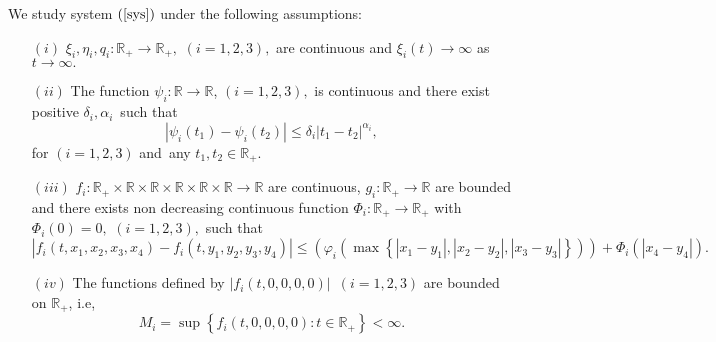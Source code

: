 \documentclass{amsart}
\theoremstyle{plain}
\numberwithin{equation}{section}
\begin{document}
\bigskip

\bigskip

\qquad We study system $\left( \text{\ref{sys}}\right) $ under the following
assumptions:

\begin{enumerate}
\item[$\left( i\right) $] $\xi _{i},\eta _{i},q_{i}:\mathbb{R}_{+}\rightarrow \mathbb{R}_{+},$ $\left( i=1,2,3\right) ,$ are continuous
and $\xi _{i}\left( t\right) \rightarrow \infty $ as $t\rightarrow \infty .$

\item[$\left( ii\right) $] The function $\psi _{i}:\mathbb{R\rightarrow R}$, 
$\left( i=1,2,3\right) ,$ is continuous and there exist positive $\delta
_{i},\alpha _{i}$\ such that 
\begin{equation*}
\left\vert \psi _{i}\left( t_{1}\right) -\psi _{i}\left( t_{2}\right)
\right\vert \leqslant \delta _{i}\left\vert t_{1}-t_{2}\right\vert ^{\alpha
_{i}},
\end{equation*}for $\left( i=1,2,3\right) $ and\ any $t_{1},t_{2}\in \mathbb{R}_{+}$.

\item[$\left( iii\right) $] $f_{i}:\mathbb{R}_{+}\times \mathbb{R\times
R\times R\times R\times R\rightarrow R}$ are continuous, $g_{i}:\mathbb{R}_{+}\mathbb{\rightarrow R}$ are bounded and there exists non decreasing
continuous function $\Phi _{i}:\mathbb{R}_{+}\mathbb{\rightarrow R}_{+}$
with $\Phi _{i}\left( 0\right) =0,$ $\left( i=1,2,3\right) ,$ such that\begin{equation*}
\left\vert f_{i}\left( t,x_{1},x_{2},x_{3},x_{4}\right) -f_{i}\left(
t,y_{1},y_{2},y_{3},y_{4}\right) \right\vert \leqslant \left( \varphi
_{i}\left( \max \left\{ \left\vert x_{1}-y_{1}\right\vert ,\left\vert
x_{2}-y_{2}\right\vert ,\left\vert x_{3}-y_{3}\right\vert \right\} \right)
\right) +\Phi _{i}\left( \left\vert x_{4}-y_{4}\right\vert \right) .
\end{equation*}

\item[$\left( iv\right) $] The functions defined by $\left\vert f_{i}\left(
t,0,0,0,0\right) \right\vert $\ $\left( i=1,2,3\right) $ are bounded on $\mathbb{R}_{+}$, i.e,\begin{equation}
M_{i}=\sup \left\{ f_{i}\left( t,0,0,0,0\right) :t\in \mathbb{R}_{+}\right\}
<\infty .  \label{M}
\end{equation}


\end{enumerate}
\end{document}
